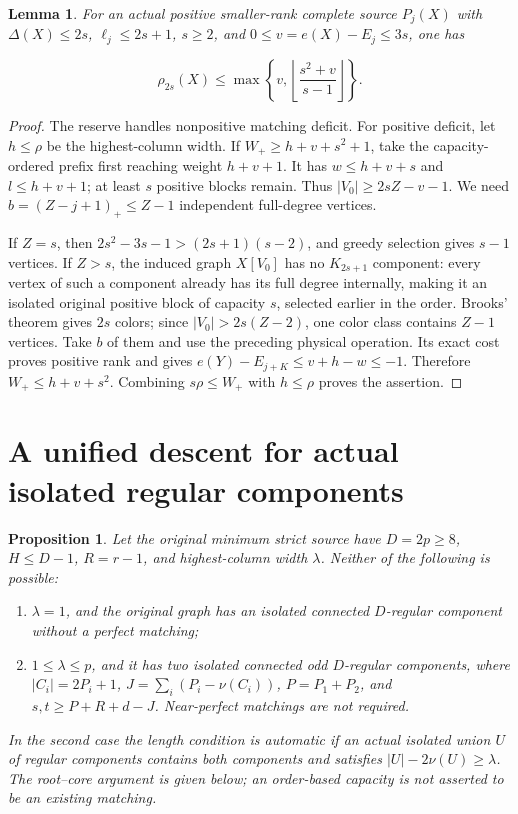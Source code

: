 \documentclass[11pt,a4paper]{article}
\newcommand{\floor}[1]{\left\lfloor#1\right\rfloor}
\newtheorem{proposition}[theorem]{Proposition}
\newtheorem{lemma}[theorem]{Lemma}
\theoremstyle{definition}
\begin{document}
\begin{lemma}\label{lem:small-even-price}
For an actual positive smaller-rank complete source $P_j(X)$ with
$\Delta(X)\le2s$, $\ell_j\le2s+1$, $s\ge2$, and
$0\le v=e(X)-E_j\le3s$, one has

\[
\rho_{2s}(X)\le
\max\left\{v,\floor{\frac{s^2+v}{s-1}}\right\}.
\]
\end{lemma}
\begin{proof}
The reserve handles nonpositive matching deficit.
For positive deficit, let $h\le\rho$ be the highest-column width.
If $W_+\ge h+v+s^2+1$, take the capacity-ordered prefix first reaching
weight $h+v+1$. It has $w\le h+v+s$ and $l\le h+v+1$;
at least $s$ positive blocks remain. Thus $|V_0|\ge2sZ-v-1$.
We need $b=(Z-j+1)_+\le Z-1$ independent full-degree vertices.

If $Z=s$, then $2s^2-3s-1>(2s+1)(s-2)$, and greedy selection gives
$s-1$ vertices. If $Z>s$, the induced graph $X[V_0]$ has no
$K_{2s+1}$ component: every vertex of such a component already has
its full degree internally, making it an isolated original positive block
of capacity $s$, selected earlier in the order.
Brooks' theorem gives $2s$ colors; since $|V_0|>2s(Z-2)$,
one color class contains $Z-1$ vertices.
Take $b$ of them and use the preceding physical operation.
Its exact cost proves positive rank and gives
$e(Y)-E_{j+K}\le v+h-w\le-1$.
Therefore $W_+\le h+v+s^2$. Combining $s\rho\le W_+$ with $h\le\rho$
proves the assertion.

\end{proof}
\section{A unified descent for actual isolated regular components}\label{app:regular-components}
\begin{proposition}\label{prop:regular-components}
Let the original minimum strict source have $D=2p\ge8$, $H\le D-1$,
$R=r-1$, and highest-column width $\lambda$. Neither of the following is possible:
\begin{enumerate}
\item $\lambda=1$, and the original graph has an isolated connected
$D$-regular component without a perfect matching;
\item $1\le\lambda\le p$, and it has two isolated connected odd
$D$-regular components, where $|C_i|=2P_i+1$,
$J=\sum_i(P_i-\nu(C_i))$, $P=P_1+P_2$, and
$s,t\ge P+R+d-J$. Near-perfect matchings are not required.
\end{enumerate}
In the second case the length condition is automatic if an actual isolated
union $U$ of regular components contains both components and satisfies
$|U|-2\nu(U)\ge\lambda$. The root--core argument is given below;
an order-based capacity is not asserted to be an existing matching.
\end{proposition}
\end{document}
